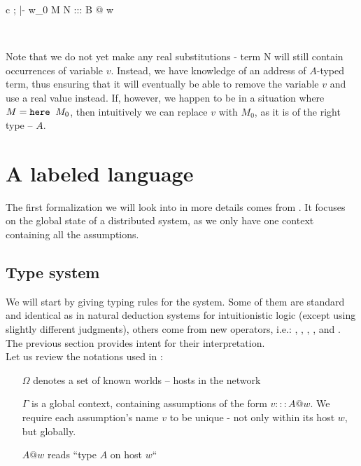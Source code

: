 \begin{center}
\footnotesize
\begin{tabular}{ c }
	{\Omega; \Gamma |-  {w_0} M N ::: B @ w}
\end{tabular}\\
\normalsize
\end{center}

Note that we do not yet make any real substitutions - term N will still contain occurrences of variable $v$. Instead, we have knowledge of an address of $A$-typed term, thus ensuring that it will eventually be able to remove the variable $v$ and use a real value instead. If, however, we happen to be in a situation where $ M = \mbox{$\operatorname{\texttt{here}}_{}\ {M_0}$}$, then intuitively we can replace $v$ with $M_0$, as it is of the right type -- $A$.


\section{A labeled language}
The first formalization we will look into in more details comes from \cite{labeled}. It focuses on the global state of a distributed system, as we only have one context containing all the assumptions.

\subsection{Type system}

We will start by giving typing rules for the system. Some of them are standard and identical as in natural deduction systems for intuitionistic logic (except using slightly different judgments), others come from new operators, i.e.: \bboxe{}, \unboxe{}, \fetche{}, \heree{},  and \gete{}. The previous section provides intent for their interpretation.\\

Let us review the notations used in \langL{}:
\begin{itemize}
\item[$\Omega$] denotes a set of known worlds -- hosts in the network
\item[$\Gamma$] is a global context, containing assumptions of the form $v:::A @ w$. We require each assumption's name $v$ to be unique - not only within its host $w$, but globally.
\item[$A@w$] reads ``type $A$ on host $w$``
\end{itemize}

